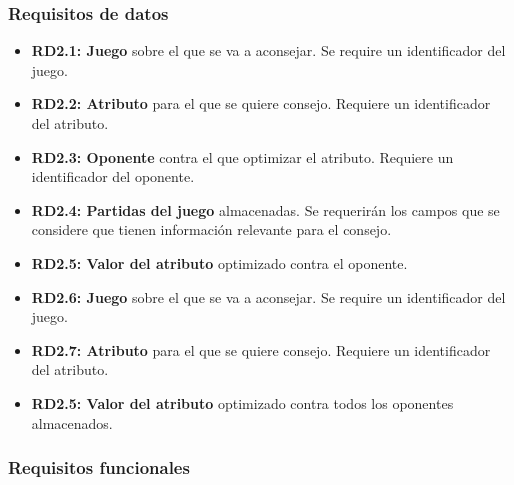 \subsubsection{Requisitos de datos}

	\begin{itemize}
		\item \textbf{RD2.1: Juego} sobre el que se va a aconsejar.
			Se require un identificador del juego.

		\item \textbf{RD2.2: Atributo} para el que se quiere consejo.
			Requiere un identificador del atributo.

		\item \textbf{RD2.3: Oponente} contra el que optimizar el atributo.
			Requiere un identificador del oponente.

		\item \textbf{RD2.4: Partidas del juego} almacenadas. 
			Se requerirán los campos que se considere que tienen información
			relevante para el consejo.

		\item \textbf{RD2.5: Valor del atributo} optimizado contra el oponente. 

		\item \textbf{RD2.6: Juego} sobre el que se va a aconsejar.
			Se require un identificador del juego.

		\item \textbf{RD2.7: Atributo} para el que se quiere consejo.
			Requiere un identificador del atributo.

		\item \textbf{RD2.5: Valor del atributo} optimizado contra todos los
			oponentes almacenados. 
	\end{itemize}


\subsubsection{Requisitos funcionales}

